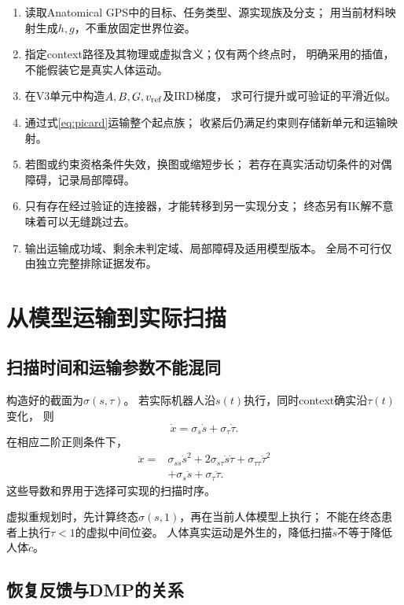 \documentclass[UTF8,11pt,a4paper,fontset=fandol]{ctexart}
\numberwithin{equation}{section}
\theoremstyle{definition}
\begin{document}
\begin{enumerate}
\item 读取Anatomical GPS中的目标、任务类型、源实现族及分支；
      用当前材料映射生成$h,g$，不重放固定世界位姿。
\item 指定context路径及其物理或虚拟含义；仅有两个终点时，
      明确采用的插值，不能假装它是真实人体运动。
\item 在V3单元中构造$A,B,G,v_{\rm ref}$及IRD梯度，
      求可行提升或可验证的平滑近似。
\item 通过式\eqref{eq:picard}运输整个起点族；
      收紧后仍满足约束则存储新单元和运输映射。
\item 若图或约束资格条件失效，换图或缩短步长；
      若存在真实活动切条件的对偶障碍，记录局部障碍。
\item 只有存在经过验证的连接器，才能转移到另一实现分支；
      终态另有IK解不意味着可以无缝跳过去。
\item 输出运输成功域、剩余未判定域、局部障碍及适用模型版本。
      全局不可行仅由独立完整排除证据发布。
\end{enumerate}

\section{从模型运输到实际扫描}

\subsection{扫描时间和运输参数不能混同}

构造好的截面为$\sigma(s,\tau)$。
若实际机器人沿$s(t)$执行，同时context确实沿$\tau(t)$变化，
则
\begin{equation}
 \dot x
 =
 \sigma_s\dot s+\sigma_\tau\dot\tau.
\end{equation}
在相应二阶正则条件下，
\begin{align}
 \ddot x={}&
 \sigma_{ss}\dot s^2+
 2\sigma_{s\tau}\dot s\dot\tau+
 \sigma_{\tau\tau}\dot\tau^2\\
 &+\sigma_s\ddot s+\sigma_\tau\ddot\tau.
\end{align}
这些导数和界用于选择可实现的扫描时序。

虚拟重规划时，先计算终态$\sigma(s,1)$，再在当前人体模型上执行；
不能在终态患者上执行$\tau<1$的虚拟中间位姿。
人体真实运动是外生的，降低扫描$\dot s$不等于降低人体$\dot c$。

\subsection{恢复反馈与DMP的关系}
\end{document}
